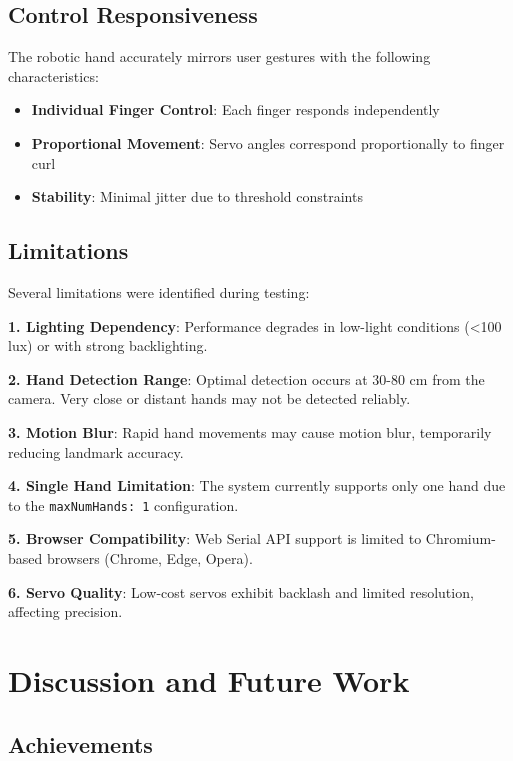 \documentclass[12pt]{article}
\begin{document}
\subsection{Control Responsiveness}

The robotic hand accurately mirrors user gestures with the following characteristics:
\begin{itemize}
    \item \textbf{Individual Finger Control}: Each finger responds independently
    \item \textbf{Proportional Movement}: Servo angles correspond proportionally to finger curl
    \item \textbf{Stability}: Minimal jitter due to threshold constraints
\end{itemize}

\subsection{Limitations}

Several limitations were identified during testing:

\textbf{1. Lighting Dependency}: Performance degrades in low-light conditions (<100 lux) or with strong backlighting.

\textbf{2. Hand Detection Range}: Optimal detection occurs at 30-80 cm from the camera. Very close or distant hands may not be detected reliably.

\textbf{3. Motion Blur}: Rapid hand movements may cause motion blur, temporarily reducing landmark accuracy.

\textbf{4. Single Hand Limitation}: The system currently supports only one hand due to the \texttt{maxNumHands: 1} configuration.

\textbf{5. Browser Compatibility}: Web Serial API support is limited to Chromium-based browsers (Chrome, Edge, Opera).

\textbf{6. Servo Quality}: Low-cost servos exhibit backlash and limited resolution, affecting precision.

\section{Discussion and Future Work}

\subsection{Achievements}
\end{document}
